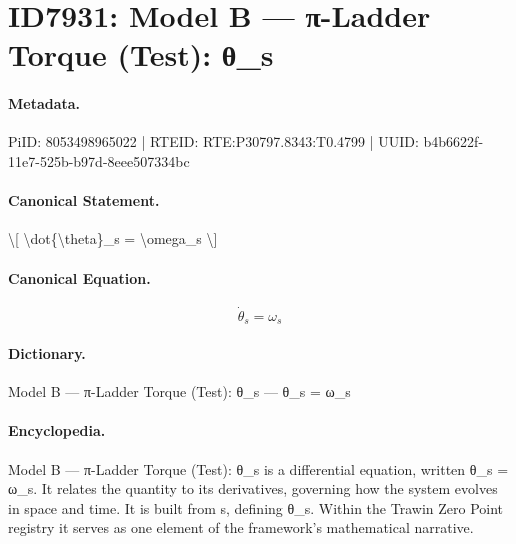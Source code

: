 \section*{ID7931: Model B — π-Ladder Torque (Test): θ\_s}
\paragraph{Metadata.}
PiID: 8053498965022 | RTEID: RTE:P30797.8343:T0.4799 | UUID: b4b6622f-11e7-525b-b97d-8eee507334bc

\paragraph{Canonical Statement.}
\textbackslash{}[ \textbackslash{}dot\{\textbackslash{}theta\}\_s = \textbackslash{}omega\_s \textbackslash{}]

\paragraph{Canonical Equation.}
\[
\dot{\theta}_s = \omega_s
\]

\paragraph{Dictionary.}
Model B — π-Ladder Torque (Test): θ\_s — θ\_s = ω\_s

\paragraph{Encyclopedia.}
Model B — π-Ladder Torque (Test): θ\_s is a differential equation, written θ\_s = ω\_s. It relates the quantity to its derivatives, governing how the system evolves in space and time. It is built from s, defining θ\_s. Within the Trawin Zero Point registry it serves as one element of the framework's mathematical narrative.
